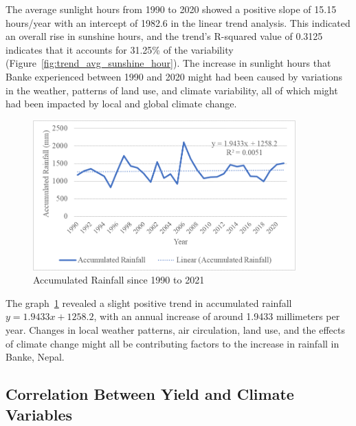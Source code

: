 The average sunlight hours from 1990 to 2020 showed a positive slope of 15.15 hours/year with an intercept of 1982.6 in the linear trend analysis. This indicated an overall rise in sunshine hours, and the trend's R-squared value of 0.3125 indicates that it accounts for 31.25\% of the variability (Figure~\ref{fig:trend_avg_sunshine_hour}). The increase in sunlight hours that Banke experienced between 1990 and 2020 might had been caused by variations in the weather, patterns of land use, and climate variability, all of which might had been impacted by local and global climate change.


\begin{figure}[H]
    \centering
    \caption{Accumulated Rainfall since 1990 to 2021} 
    \label{fig:trend_accumulated_rainfall}
    \includegraphics[width=0.9\textwidth]{images/trend_accumulated_rainfall.png}
\end{figure}


The graph~\ref{fig:trend_accumulated_rainfall} revealed a slight positive trend in accumulated rainfall $y=1.9433x + 1258.2$, with an annual increase of around 1.9433 millimeters per year. Changes in local weather patterns, air circulation, land use, and the effects of climate change might all be contributing factors to the increase in rainfall in Banke, Nepal.

\subsection{Correlation Between Yield and Climate Variables}


\begin{table}[htbp]
    \centering
    \caption{Correlation Table between Yield and Climate Variables}
\end{table}

